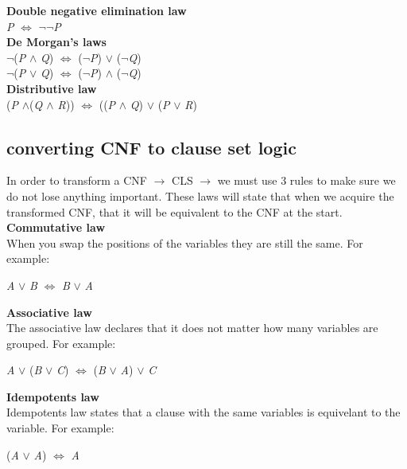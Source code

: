 \documentclass[11pt,a4paper]{report}
\begin{document}
\noindent \textbf{Double negative elimination law}\\
\textit{P} $\Leftrightarrow$ $\neg$$\neg$\textit{P}\\

\noindent \textbf{De Morgan's laws}\\
$\neg$(\textit{P} $\land$ \textit{Q}) $\Leftrightarrow$ ($\neg$\textit{P}) $\lor$ ($\neg$\textit{Q})\\
$\neg$(\textit{P} $\lor$ \textit{Q}) $\Leftrightarrow$ ($\neg$\textit{P}) $\land$ ($\neg$\textit{Q})\\

\noindent \textbf{Distributive law}\\
(\textit{P} $\land$(\textit{Q $\land$ \textit{R}})) $\Leftrightarrow$ ((\textit{P} $\land$ \textit{Q}) $\lor$ (\textit{P} $\lor$ \textit{R})

\subsection{converting CNF to clause set logic}
In order to transform a CNF $\rightarrow$ CLS $\rightarrow$ we must use 3 rules to make sure we do not lose anything important. These laws will state that when we acquire the transformed CNF, that it will be equivalent to the CNF at the start. \\

\textbf{Commutative law}\\
When you swap the positions of the variables they are still the same. For example:
\begin{center}
\textit{A} $\lor$ \textit{B} $\Leftrightarrow$ \textit{B} $\lor$ \textit{A}
\end{center}

\textbf{Associative law}\\
The associative law declares that it does not matter how many variables are grouped. For example:

\begin{center}
\textit{A} $\lor$ (\textit{B} $\lor$ \textit{C}) $\Leftrightarrow$ (\textit{B} $\lor$ \textit{A}) $\lor$ \textit{C}
\end{center}

\textbf{Idempotents law}\\
Idempotents law states that a clause with the same variables is equivelant to the variable. For example:

\begin{center}
(\textit{A} $\lor$ \textit{A}) $\Leftrightarrow$ \textit{A}
\end{center}
\end{document}
